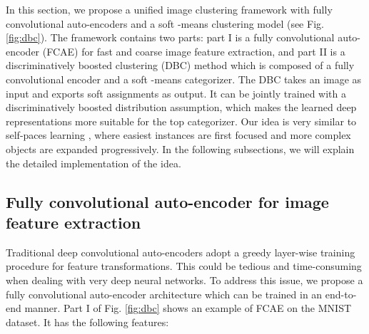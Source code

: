 \documentclass[preprint,12pt]{elsarticle}
\begin{document}
In this section, we propose a unified image clustering framework with fully convolutional auto-encoders and
a soft -means clustering model (see Fig. \ref{fig:dbc}). The framework contains two parts: part I is a fully
convolutional auto-encoder (FCAE) for fast and coarse image feature extraction, and part II is a discriminatively
boosted clustering (DBC) method which is composed of a fully convolutional encoder and a soft -means categorizer.
The DBC takes an image as input and exports soft assignments as output. It can be jointly trained with a
discriminatively boosted distribution assumption, which makes the learned deep representations more suitable
for the top categorizer. Our idea is very similar to self-paces learning \cite{Lee2011easy}, where easiest
instances are first focused and more complex objects are expanded progressively. In the following subsections,
we will explain the detailed implementation of the idea.


\subsection{Fully convolutional auto-encoder for image feature extraction}

Traditional deep convolutional auto-encoders adopt a greedy layer-wise training procedure for feature transformations.
This could be tedious and time-consuming when dealing with very deep neural networks. To address this issue,
we propose a fully convolutional auto-encoder architecture which can be trained in an end-to-end manner.
Part I of Fig. \ref{fig:dbc} shows an example of FCAE on the MNIST dataset. It has the following features:
\end{document}

